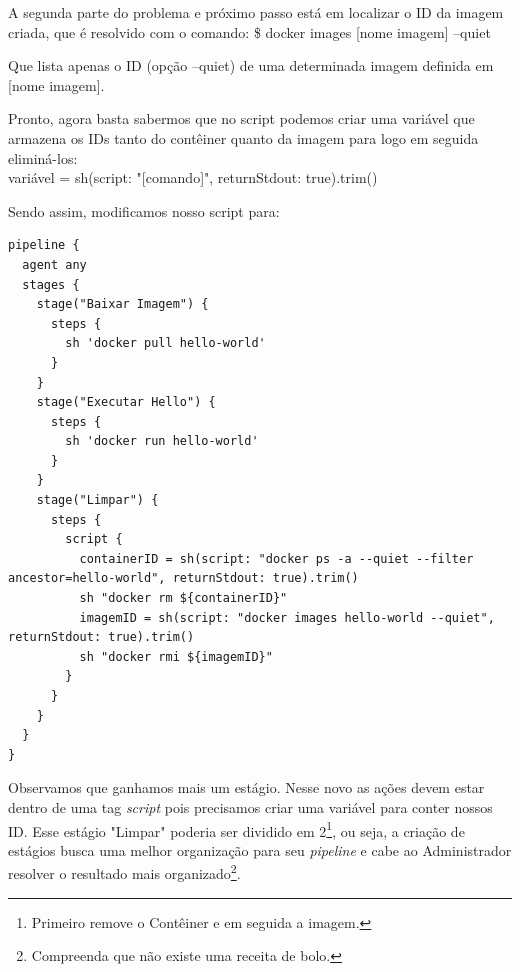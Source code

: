 \documentclass[a4paper,11pt]{article}
\begin{document}
A segunda parte do problema e próximo passo está em localizar o ID da imagem criada, que é resolvido com o comando:
{\ttfamily\$ docker images [nome imagem] --quiet}

Que lista apenas o ID (opção {\ttfamily --quiet}) de uma determinada imagem definida em [nome imagem].

Pronto, agora basta sabermos que no script podemos criar uma variável que armazena os IDs tanto do contêiner quanto da imagem para logo em seguida eliminá-los: \\
{\ttfamily variável = sh(script: "[comando]", returnStdout: true).trim()}

Sendo assim, modificamos nosso script para:
\begin{lstlisting}
pipeline {
  agent any
  stages {
    stage("Baixar Imagem") {
      steps {
        sh 'docker pull hello-world'
      }
    }
    stage("Executar Hello") {
      steps {
        sh 'docker run hello-world'
      }
    }
    stage("Limpar") {
      steps {
        script {
          containerID = sh(script: "docker ps -a --quiet --filter ancestor=hello-world", returnStdout: true).trim()
          sh "docker rm ${containerID}"
          imagemID = sh(script: "docker images hello-world --quiet", returnStdout: true).trim()
          sh "docker rmi ${imagemID}"
        }
      }
    }        
  }
}
\end{lstlisting}

Observamos que ganhamos mais um estágio. Nesse novo as ações devem estar dentro de uma tag \textit{script} pois precisamos criar uma variável para conter nossos ID. Esse estágio "Limpar" poderia ser dividido em 2\footnote{Primeiro remove o Contêiner e em seguida a imagem.}, ou seja, a criação de estágios busca uma melhor organização para seu \textit{pipeline} e cabe ao Administrador resolver o resultado mais organizado\footnote{Compreenda que não existe uma receita de bolo.}.
\end{document}

